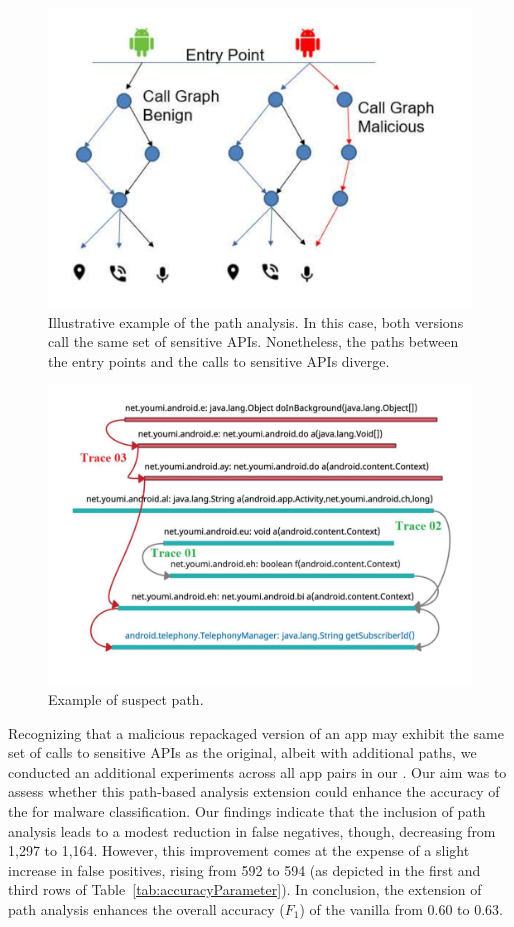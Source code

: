 \begin{figure}[ht]
\centering
\includegraphics[scale=0.30]{images/maliciousCallGraph.pdf}
\caption{Illustrative example of the path analysis. In this case, both versions call the same set of sensitive APIs. Nonetheless,
the paths between the entry points and the calls to sensitive APIs diverge.}
 \label{fig:callGraph}
\end{figure}

\begin{figure}
\centering
\includegraphics[scale=0.28]{images/maliciousTrace_example01.pdf}
\caption{Example of suspect path.}
 \label{fig:maliciousTrace}
\end{figure}

Recognizing that a malicious repackaged version of an app may exhibit the same set of calls
to sensitive APIs as the original, albeit with additional paths, we conducted an additional experiments
across all app pairs in our \cds. Our aim was to assess whether this path-based analysis extension could enhance
the accuracy of the \mas for malware classification. Our findings indicate that the inclusion of path analysis
leads to a modest reduction in false negatives, though, decreasing from 1,297 to 1,164.
However, this improvement comes at the expense of a slight increase in false positives, rising from 592 to 594
(as depicted in the first and third rows of Table~\ref{tab:accuracyParameter}).
In conclusion, the extension of path analysis enhances the overall accuracy ($F_1$) of the vanilla
\mas from 0.60 to 0.63.

